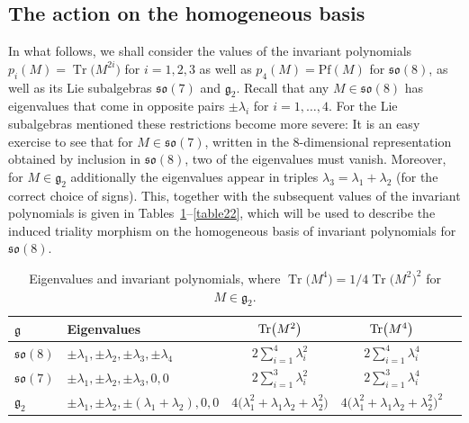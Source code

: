\documentclass[pdftex]{sigma}
\numberwithin{equation}{section}
\newcommand{\Tr}{\operatorname{Tr}}
\begin{document}
\subsection{The action on the homogeneous basis}
In what follows, we shall consider the values of the invariant polynomials $p_i (M) = \Tr\big(M^{2i}\big)$ for $i=1,2,3$ as well as $p_4(M) = \mathrm{Pf}(M)$ for $\mathfrak{so}(8)$, as well as its Lie subalgebras $\mathfrak{so}(7)$ and $\mathfrak{g}_2$. Recall that any $M \in \mathfrak{so}(8)$ has eigenvalues that come in opposite pairs $\pm \lambda_i$ for $i=1,\dots,4$. For the Lie subalgebras mentioned these restrictions become more severe: It is an easy exercise to see that for $M \in \mathfrak{so}(7)$, written in the 8-dimensional representation obtained by inclusion in $\mathfrak{so}(8)$, two of the eigenvalues must vanish. Moreover, for $M \in \mathfrak{g}_2$ additionally the eigenvalues appear in triples $\lambda_3 = \lambda_1 + \lambda_2$ (for the correct choice of signs). This, together with the subsequent values of the invariant polynomials is given in Tables~\ref{table2}--\ref{table22}, which will be used to describe the induced triality morphism on the homogeneous basis of invariant polynomials for $\mathfrak{so}(8)$.

 \begin{table}[h]\centering\renewcommand{\arraystretch}{1.3}
\begin{tabular}{llccc}
 $\mathfrak{g}$ & Eigenvalues & ${\rm Tr}\big(M^2\big)$& ${\rm Tr}\big(M^4\big)$\\
\hline
$\mathfrak{so}(8)$ & $\pm \lambda_1,\pm \lambda_2,\pm \lambda_3,\pm \lambda_4$	&$2\sum_{i=1}^4\lambda_i^2$ &$2\sum_{i=1}^4\lambda_i^4$ \\
$\mathfrak{so}(7)$ & $\pm \lambda_1,\pm \lambda_2,\pm \lambda_3,0,0$	&$2\sum_{i=1}^3\lambda_i^2$ &$2\sum_{i=1}^3\lambda_i^4$ \\
$\mathfrak{g}_{2}$ & $\pm \lambda_1,\pm \lambda_2,\pm (\lambda_1+\lambda_2),0,0$	& $4\big(\lambda^2_1+\lambda_1\lambda_2+\lambda_2^2\big)$ & $4 \big(\lambda_1 ^2 + \lambda_1 \lambda_2 + \lambda_2^2\big)^2$ \\
\end{tabular}
\caption{Eigenvalues and invariant polynomials, where $\Tr\big(M^4\big) = 1/4 \Tr\big(M^2\big)^2 $ for $M \in \mathfrak{g_2}$.}\label{table2}
\end{table}
\end{document}
